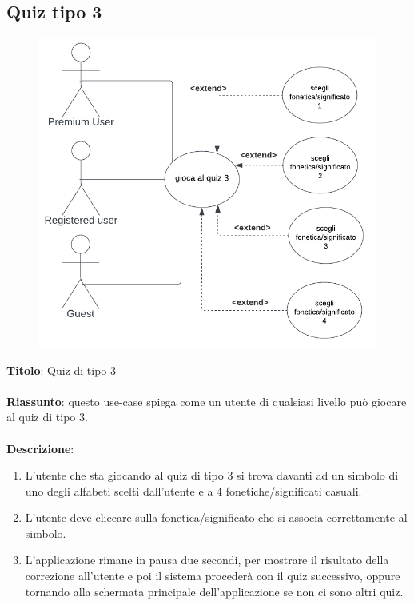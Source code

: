 \newpage
\subsection{Quiz tipo 3} \label{req_quiz_3}
\begin{figure}[!h]
\centering
\includegraphics[scale=0.35]{images/use_case_quiz_3.png}
\end{figure}
\noindent
\textbf{Titolo}: Quiz di tipo 3\\
\\
\textbf{Riassunto}: questo use-case spiega come un utente di qualsiasi livello può giocare al quiz di tipo 3.\\
\\
\textbf{Descrizione}:
\begin{enumerate}
    \item L'utente che sta giocando al quiz di tipo 3 si trova davanti ad un simbolo di uno degli alfabeti scelti dall'utente e a 4 fonetiche/significati casuali.
    \item L'utente deve cliccare sulla fonetica/significato che si associa correttamente al simbolo.
    \item L'applicazione rimane in pausa due secondi, per mostrare il risultato della correzione all'utente e poi il sistema procederà con il quiz successivo, oppure tornando alla schermata principale dell'applicazione se non ci sono altri quiz.
\end{enumerate}

